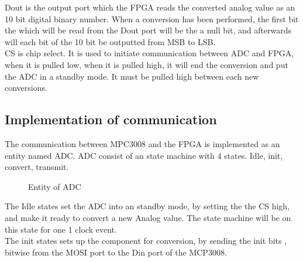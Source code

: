 Dout is the output port which the FPGA reads the converted analog value as an 10 bit digital binary number. When a conversion has been performed,  the first bit the which will be read from the Dout port will be the a null bit, and afterwards will each bit of the 10 bit be outputted from MSB to LSB. \\


CS is chip select. It is used to initiate communication between ADC and FPGA, when it is pulled low, when it is pulled high, it will end the conversion and put the ADC in a standby mode.  It must be pulled high between each new conversions. 
 

\subsection{Implementation of communication}

The communication between MPC3008 and the FPGA is implemented as an entity named ADC. ADC consist of an state machine with 4 states. 
Idle, init, convert, transmit. \\
 
 


\begin{figure}[htb]
\centering
{}
\caption{Entity of ADC}
\end{figure}
 
The Idle states set the ADC into an standby mode, by setting the the CS high, and make it ready to convert a new Analog value.  The state machine will be on this state for one 1 clock event. \\

The init states sets up the component for conversion, by sending the init bits , bitwise from the MOSI port to the Din port of the MCP3008. 


